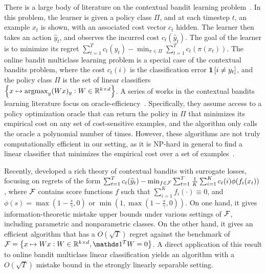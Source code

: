 There is a large body of literature on the contextual bandit learning
problem~\citep{Auer-2003, Langford-Zhang-2008}. In this problem, the learner is
given a policy class $\Pi$, and at each timestep $t$, an example $x_t$ is shown,
with an associated cost vector $c_t$ hidden. The learner then takes an action
$\widehat{y}_t$, and observes the incurred cost $c_t(\widehat{y}_t)$.
The goal of the learner is to minimize its regret $\sum_{t=1}^T c_t(\widehat{y}_t) - \min_{\pi \in \Pi}
\sum_{t=1}^T c_t(\pi(x_t))$. The online bandit multiclass learning problem is a
special case of the contextual bandits problem, where the cost $c_t(i)$ is the
classification error $\mathbf{1}\left[i \neq y_t \right]$, and the policy class $\Pi$ is the set of
linear classifiers $\cbr{x \mapsto \argmax_y (Wx)_y: W \in \R^{k \times d}}$. A
series of works in the contextual bandits learning literature focus on
oracle-efficiency~\citep{Dudik-Hsu-Kale-Karampatziakis-Langford-Reyzin-Zhang-2011,
Agarwal-Hsu-Kale-Langford-Li-Schapire-2014, Rakhlin-Sridharan-2016,
Syrgkanis-Krishnamurthy-Schapire-2016,
Syrgkanis-Luo-Krishnamurthy-Schapire-2016}. Specifically, they assume access to
a policy optimization oracle that can return the policy in $\Pi$ that minimizes its
empirical cost on any set of cost-sensitive examples, and the algorithm only calls the oracle a
polynomial number of times. However, these algorithms are not truly
computationally efficient in our setting, as it is NP-hard in general to find a
linear classifier that minimizes the empirical cost over a set of
examples~\citep{Arora-Babai-Stern-Sweedyk-1997}.


Recently, \citet{Foster-Krishnamurthy-2018} developed a rich theory of
contextual bandits with surrogate losses, focusing on regrets of the form
$\sum_{t=1}^T c_t(\widehat{y}_t) - \min_{f \in \mathcal{F}} \sum_{t=1}^T \frac{1}{K} \sum_{i=1}^K c_t(i) \phi( f_i(x_t)
)$, where $\mathcal{F}$ contains score functions $f$ such that $\sum_{i=1}^K
f_i(\cdot) \equiv 0$, and $\phi(s) = \max(1 - \frac s \gamma, 0)$ or $\min(1,
\max(1 - \frac s \gamma, 0))$. On one hand, it gives information-theoretic
mistake upper bounds under various settings of $\mathcal{F}$, including parametric and
nonparametric classes. On the other hand, it gives an efficient algorithm that
has a $O(\sqrt{T})$ regret against the benchmark of $\calF = \cbr{x \mapsto W x:
W \in \R^{k \times d}, \one^T W = 0}$. A direct application of this result to
online bandit multiclass linear classification yields an algorithm with a
$O(\sqrt{T})$ mistake bound in the strongly linearly separable setting.


